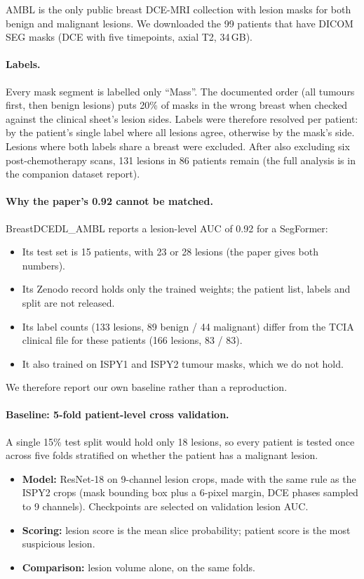 \documentclass[11pt]{article}
\begin{document}
AMBL is the only public breast DCE-MRI collection with lesion masks for both
benign and malignant lesions. We downloaded the 99 patients that have DICOM
SEG masks (DCE with five timepoints, axial T2, 34\,GB).

\paragraph{Labels.} Every mask segment is labelled only ``Mass''. The
documented order (all tumours first, then benign lesions) puts 20\% of
masks in the wrong breast when checked against the clinical sheet's lesion
sides. Labels were therefore resolved per patient: by the patient's single
label where all lesions agree, otherwise by the mask's side. Lesions where
both labels share a breast were excluded. After also excluding six
post-chemotherapy scans, 131 lesions in 86 patients remain (the full analysis
is in the companion dataset report).

\paragraph{Why the paper's 0.92 cannot be matched.} BreastDCEDL\_AMBL reports
a lesion-level AUC of 0.92 for a SegFormer:
\begin{itemize}
  \item Its test set is 15 patients, with 23 or 28 lesions (the paper gives
  both numbers).
  \item Its Zenodo record holds only the trained weights; the patient list,
  labels and split are not released.
  \item Its label counts (133 lesions, 89 benign / 44 malignant) differ from the
  TCIA clinical file for these patients (166 lesions, 83 / 83).
  \item It also trained on ISPY1 and ISPY2 tumour masks, which we do not hold.
\end{itemize}
We therefore report our own baseline rather than a reproduction.

\paragraph{Baseline: 5-fold patient-level cross validation.} A single 15\%
test split would hold only 18 lesions, so every patient is tested once
across five folds stratified on whether the patient has a malignant lesion.
\begin{itemize}
  \item \textbf{Model:} ResNet-18 on 9-channel lesion crops, made with the same
    rule as the ISPY2 crops (mask bounding box plus a 6-pixel margin, DCE phases
    sampled to 9 channels). Checkpoints are selected on validation lesion AUC.
  \item \textbf{Scoring:} lesion score is the mean slice probability; patient
    score is the most suspicious lesion.
  \item \textbf{Comparison:} lesion volume alone, on the same folds.
\end{itemize}
\end{document}
